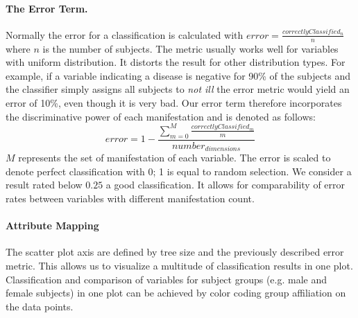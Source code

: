 \documentclass[a4paper,twoside]{style/article}
\begin{document}
\paragraph{The Error Term. }
Normally the error for a classification is calculated with $error = \frac{correctlyClassified_{n}} {n}$ where $n$ is the number of subjects.
The metric usually works well for variables with uniform distribution.
It distorts the result for other distribution types.
For example, if a variable indicating a disease is negative for 90\% of the subjects and the classifier simply assigns all subjects to \emph{not ill} the error metric would yield an error of 10\%, even though it is very bad.
Our error term therefore incorporates the discriminative power of each manifestation and is denoted as follows:
\begin{equation}
error = 1 - \frac{\sum_{m=0}^M \frac{correctlyClassified_{m}}{m}}{number_{dimensions}}
\end{equation}
$M$ represents the set of manifestation of each variable.
The error is scaled to denote perfect classification with 0; 1 is equal to random selection.
We consider a result rated below $0.25$ a good classification.
It allows for comparability of error rates between variables with different manifestation count.

\paragraph{Attribute Mapping}
The scatter plot axis are defined by tree size and the previously described error metric.
This allows us to visualize a multitude of classification results in one plot.
Classification and comparison of variables for subject groups (e.g. male and female subjects) in one plot can be achieved by color coding group affiliation on the data points.
\end{document}
